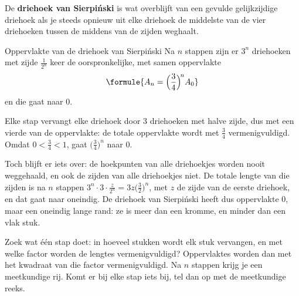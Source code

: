 \begin{theorie}
De \textbf{\textcolor{accent}{driehoek van Sierpiński}} is wat overblijft van een gevulde gelijkzijdige driehoek als je steeds opnieuw uit elke driehoek de middelste van de vier driehoeken tussen de middens van de zijden weghaalt.

\begin{stelling}{Oppervlakte van de driehoek van Sierpiński}
Na $n$ stappen zijn er $3^n$ driehoeken met zijde $\tfrac{1}{2^n}$ keer de oorspronkelijke, met samen oppervlakte
\[
\formule{A_n = \Bigl(\frac34\Bigr)^{\!n} A_0}
\]
en die gaat naar 0.
\end{stelling}

\begin{bewijs}
Elke stap vervangt elke driehoek door 3 driehoeken met halve zijde, dus met een vierde van de oppervlakte: de totale oppervlakte wordt met $\tfrac34$ vermenigvuldigd. Omdat $0 < \tfrac34 < 1$, gaat $\bigl(\tfrac34\bigr)^n$ naar 0.
\end{bewijs}
\end{theorie}

Toch blijft er iets over: de hoekpunten van alle driehoekjes worden nooit weggehaald, en ook de zijden van alle driehoekjes niet. De totale lengte van die zijden is na $n$ stappen $3^n \cdot 3 \cdot \tfrac{z}{2^n} = 3z\bigl(\tfrac32\bigr)^n$, met $z$ de zijde van de eerste driehoek, en dat gaat naar oneindig. De driehoek van Sierpiński heeft dus oppervlakte 0, maar een oneindig lange rand: ze is meer dan een kromme, en minder dan een vlak stuk.


\begin{werkwijze}
Zoek wat één stap doet: in hoeveel stukken wordt elk stuk vervangen, en met welke factor worden de lengtes vermenigvuldigd? Oppervlaktes worden dan met het kwadraat van die factor vermenigvuldigd. Na $n$ stappen krijg je een meetkundige rij. Komt er bij elke stap iets bij, tel dan op met de meetkundige reeks.
\end{werkwijze}

